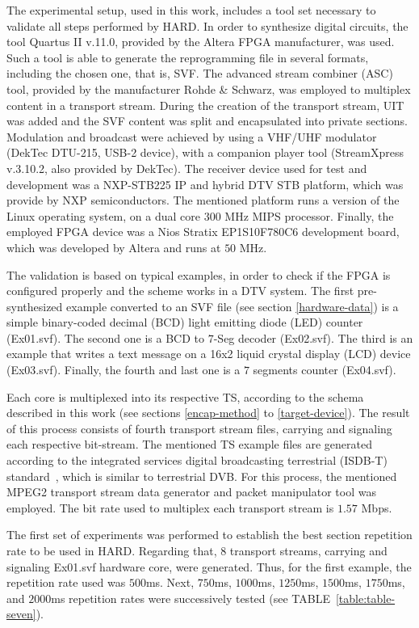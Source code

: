 The experimental setup, used in this work, includes a tool set necessary to validate all steps performed by HARD. In order to synthesize digital circuits, the tool Quartus II v.11.0, provided by the Altera FPGA manufacturer, was used. Such a tool is able to generate the reprogramming file in several formats, including the chosen one, that is, SVF. The advanced stream combiner (ASC) tool, provided by the manufacturer Rohde \& Schwarz, was employed to multiplex content in a transport stream. During the creation of the transport stream, UIT was added and the SVF content was split and encapsulated into private sections. Modulation and broadcast were achieved by using a VHF/UHF modulator (DekTec DTU-215, USB-2 device), with a companion player tool (StreamXpress v.3.10.2, also provided by DekTec). The receiver device used for test and development was a NXP-STB225 IP and hybrid DTV STB platform, which was provide by NXP semiconductors. The mentioned platform runs a version of the Linux operating system, on a dual core $300$ MHz MIPS processor. Finally, the employed FPGA device was a Nios Stratix EP1S10F780C6 development board, which was developed by Altera and runs at $50$ MHz.

The validation is based on typical examples, in order to check if the FPGA is configured properly and the scheme works in a DTV system. The first pre-synthesized example converted to an SVF file (see section \ref{hardware-data}) is a simple binary-coded decimal (BCD) light emitting diode (LED) counter (Ex01.svf). The second one is a BCD to $7$-Seg decoder (Ex02.svf). The third is an example that writes a text message on a 16x2 liquid crystal display (LCD) device (Ex03.svf). Finally, the fourth and last one is a $7$ segments counter (Ex04.svf).

Each core is multiplexed into its respective TS, according to the schema described in this work (see sections \ref{encap-method} to \ref{target-device}). The result of this process consists of fourth transport stream files, carrying and signaling each respective bit-stream. The mentioned TS example files are generated according to the integrated services digital broadcasting terrestrial (ISDB-T) standard~\cite{ref33}, which is similar to terrestrial DVB. For this process, the mentioned MPEG2 transport stream data generator and packet manipulator tool was employed. The bit rate used to multiplex each transport stream is $1.57$ Mbps.

The first set of experiments was performed to establish the best section repetition rate to be used in HARD. Regarding that, $8$ transport streams, carrying and signaling Ex01.svf hardware core, were generated. Thus, for the first example, the repetition rate used was $500$ms. Next, $750$ms, $1000$ms, $1250$ms, $1500$ms, $1750$ms, and $2000$ms repetition rates were successively tested (see TABLE~\ref{table:table-seven}).



